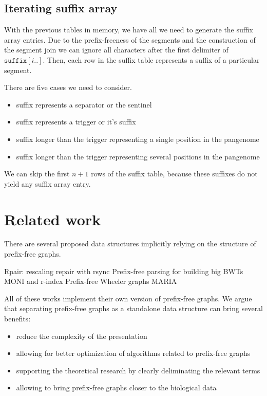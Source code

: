 \documentclass[twocolumn]{ceurart}
\begin{document}


\subsection{Iterating suffix array}
With the previous tables in memory, we have all we need to generate the suffix
array entries.
Due to the prefix-freeness of the segments and the construction of the segment join
we can ignore all characters after the first delimiter of $\texttt{suffix}[i..]$.
Then, each row in the suffix table represents a suffix of a particular segment.

There are five cases we need to consider.
\begin{itemize}
    \item suffix represents a separator or the sentinel
    \item suffix represents a trigger or it's suffix
    \item suffix longer than the trigger representing a single position in the pangenome
    \item suffix longer than the trigger representing several positions in the pangenome
\end{itemize}

We can skip the first $n+1$ rows of the suffix table, because these suffixes
do not yield any suffix array entry.

\section{Related work}
There are several proposed data structures implicitly relying on the structure
of prefix-free graphs.

Rpair: rescaling repair with rsync \cite{2019gagie}
Prefix-free parsing for building big BWTs \cite{2019boucher}
MONI and r-index \cite{}
Prefix-free Wheeler graphs \cite{2022pfwg}
MARIA \cite{2022maria}

All of these works implement their own version of prefix-free graphs.
We argue that separating prefix-free graphs as a standalone data structure can
bring several benefits:

\begin{itemize}
    \item reduce the complexity of the presentation
    \item allowing for better optimization of algorithms related to prefix-free graphs
    \item supporting the theoretical research by clearly deliminating the relevant terms
    \item allowing to bring prefix-free graphs closer to the biological data
\end{itemize}
\end{document}
